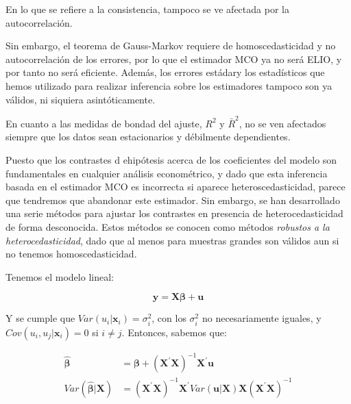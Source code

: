 En lo que se refiere a la consistencia, tampoco se ve afectada por la autocorrelaci\'on.

Sin embargo, el teorema de Gauss-Markov requiere de homoscedasticidad y no autocorrelaci\'on de los errores, por lo que el estimador MCO ya no ser\'a ELIO, y por tanto no ser\'a eficiente. Adem\'as, los errores est\'adary los estad\'isticos que hemos utilizado para realizar inferencia sobre los estimadores tampoco son ya v\'alidos, ni siquiera asint\'oticamente.

En cuanto a las medidas de bondad del ajuste, $R^2$ y $\bar{R}^2$, no se ven afectados siempre que los datos sean estacionarios y d\'ebilmente dependientes.



Puesto que los contrastes d ehip\'otesis acerca de los coeficientes del modelo son fundamentales en cualquier an\'alisis econom\'etrico, y dado que esta inferencia basada en el estimador MCO es incorrecta si aparece heteroscedasticidad, parece que tendremos que abandonar este estimador. Sin embargo, se han desarrollado una serie m\'etodos para ajustar los contrastes en presencia de heterocedasticidad de forma desconocida. Estos m\'etodos se conocen como m\'etodos \textit{robustos a la heterocedasticidad}, dado que al menos para muestras grandes son v\'alidos aun si no tenemos homoscedasticidad.

Tenemos el modelo lineal:

\begin{equation*}
\boldsymbol{y}=\boldsymbol{X\beta}+\boldsymbol{u}
\end{equation*}

Y se cumple que $Var(u_i|\boldsymbol{x}_i)=\sigma^2_i$, con los $\sigma^2_i$ no necesariamente iguales, y $Cov(u_i,u_j|\boldsymbol{x}_i)=0$ si $i\neq j$. Entonces, sabemos que:

\begin{align*}
\hat{\boldsymbol{\beta}}&=\boldsymbol{\beta}+\left(\boldsymbol{X}^{\prime}\boldsymbol{X}\right)^{-1}\boldsymbol{X}^{\prime}\boldsymbol{u} \\
Var(\hat{\boldsymbol{\beta}}|\boldsymbol{X})&=\left(\boldsymbol{X}^{\prime}\boldsymbol{X}\right)^{-1}\boldsymbol{X}^{\prime}Var(\boldsymbol{u}|\boldsymbol{X})\boldsymbol{X}\left(\boldsymbol{X}^{\prime}\boldsymbol{X}\right)^{-1}
\end{align*}

